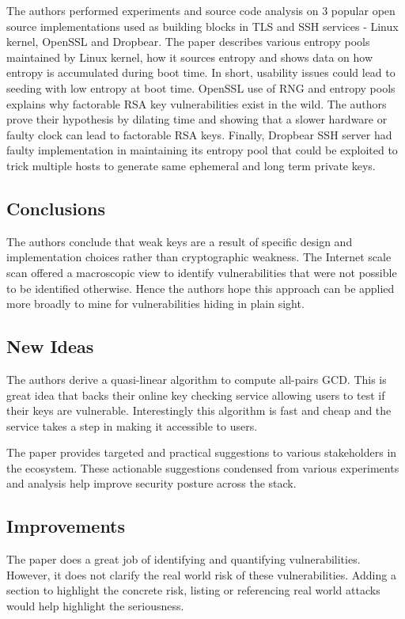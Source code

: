 \documentclass[12pt]{article}
\begin{document}
    The authors performed experiments and source code analysis on 3 popular open source implementations used as building blocks in TLS and SSH services - Linux kernel, OpenSSL and Dropbear. The paper describes various entropy pools maintained by Linux kernel, how it sources entropy and shows data on how entropy is accumulated during boot time. In short, usability issues could lead to seeding with low entropy at boot time. OpenSSL use of RNG and entropy pools explains why factorable RSA key vulnerabilities exist in the wild. The authors prove their hypothesis by dilating time and showing that a slower hardware or faulty clock can lead to factorable RSA keys. Finally, Dropbear SSH server had faulty implementation in maintaining its entropy pool that could be exploited to trick multiple hosts to generate same ephemeral and long term private keys.

    \subsection*{Conclusions}
    The authors conclude that weak keys are a result of specific design and implementation choices rather than cryptographic weakness. The Internet scale scan offered a macroscopic view to identify vulnerabilities that were not possible to be identified otherwise. Hence the authors hope this approach can be applied more broadly to mine for vulnerabilities hiding in plain sight.

    \subsection*{New Ideas}
    The authors derive a quasi-linear algorithm to compute all-pairs GCD. This is great idea that backs their online key checking service allowing users to test if their keys are vulnerable. Interestingly this algorithm is fast and cheap and the service takes a step in making it accessible to users.

    The paper provides targeted and practical suggestions to various stakeholders in the ecosystem. These actionable suggestions condensed from various experiments and analysis help improve security posture across the stack.

    \subsection*{Improvements}
    The paper does a great job of identifying and quantifying vulnerabilities. However, it does not clarify the real world risk of these vulnerabilities. Adding a section to highlight the concrete risk, listing or referencing real world attacks would help highlight the seriousness.
\end{document}
